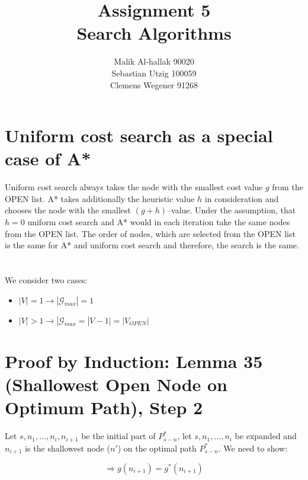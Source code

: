 \documentclass[11pt]{article}
\title{\textbf{Assignment 5\\}Search Algorithms}
\author{Malik Al-hallak 90020\\
		Sebastian Utzig 100059\\
		Clemens Wegener 91268}
\date{}
\begin{document}
\maketitle
\section{Uniform cost search as a special case of A*}
	Uniform cost search always takes the node with the smallest cost value $g$ from the OPEN list. A* takes additionally the heuristic value $h$ in consideration and chooses the node with the smallest $(g+h)$--value. Under the assumption, that $h = 0$ uniform cost search and A* would in each iteration take the same nodes from the OPEN list. The order of nodes, which are selected from the OPEN list is the same for A* and uniform cost search and therefore, the search is the same.
\section{}
	We consider two cases:
	\begin{itemize}
		\item $|V|=1 \rightarrow |\mathcal{G}_{max}|=1$
		\item $|V|>1 \rightarrow |\mathcal{G}_{max}=|V-1|=|V_{OPEN}|$
	\end{itemize}
\section{Proof by Induction: Lemma 35 (Shallowest Open Node on Optimum Path), Step 2}

Let $s, n_1, \dots, n_i, n_{i+1}$ be the initial part of $P^*_{s-n}$, let $s, n_1, \dots, n_i$ be expanded and $n_{i+1}$ is the shallowest node ($n'$) on the optimal path $P^*_{s-n}$.
We need to show:

\begin{equation*}
\Rightarrow g(n_{i+1})=g^*(n_{i+1})
\end{equation*}
\end{document}
